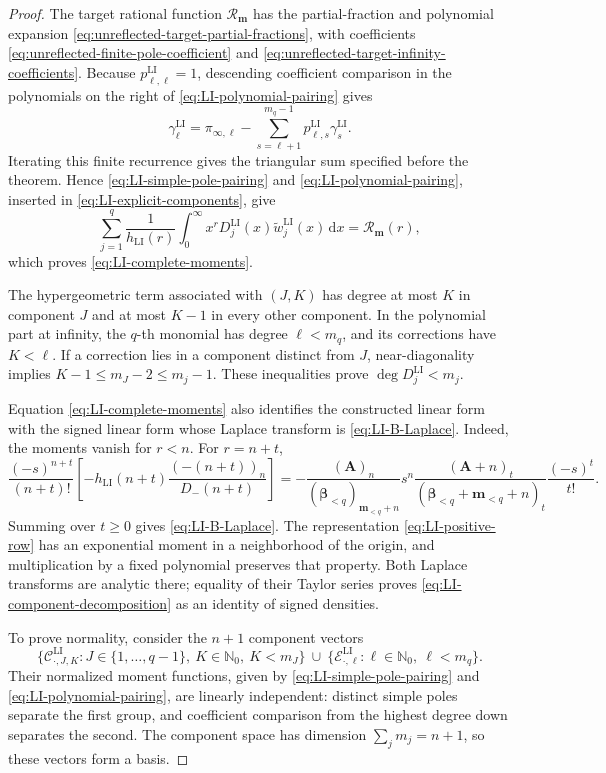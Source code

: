 \documentclass[10pt]{amsart}
\newcommand{\Nzero}{\mathbb N_0}
\newcommand{\dd}{\,\mathrm d}
\newcommand{\A}{\boldsymbol A}
\newcommand{\bbeta}{\boldsymbol\beta}
\newcommand{\mm}{\boldsymbol m}
\theoremstyle{plain}
\theoremstyle{definition}
\theoremstyle{remark}
\begin{document}
\begin{proof}
The target rational function \(\mathcal R_{\mm}\) has the partial-fraction and
polynomial expansion \eqref{eq:unreflected-target-partial-fractions},
with coefficients \eqref{eq:unreflected-finite-pole-coefficient} and
\eqref{eq:unreflected-target-infinity-coefficients}.  Because
\(p_{\ell,\ell}^{\mathrm{LI}}=1\), descending coefficient comparison in
the polynomials on the right of \eqref{eq:LI-polynomial-pairing} gives
\[
 \gamma_\ell^{\mathrm{LI}}
 =\pi_{\infty,\ell}
 -\sum_{s=\ell+1}^{m_q-1}
  p_{\ell,s}^{\mathrm{LI}}\gamma_s^{\mathrm{LI}}.
\]
Iterating this finite recurrence gives the triangular sum specified before
the theorem. Hence \eqref{eq:LI-simple-pole-pairing} and
\eqref{eq:LI-polynomial-pairing}, inserted in
\eqref{eq:LI-explicit-components}, give
\[
 \sum_{j=1}^q\frac1{h_{\mathrm{LI}}(r)}
 \int_0^\infty x^rD_j^{\mathrm{LI}}(x)
 \widetilde w_j^{\mathrm{LI}}(x)\dd x
 =\mathcal R_{\mm}(r),
\]
which proves \eqref{eq:LI-complete-moments}.

The hypergeometric term associated with \((J,K)\) has degree at most \(K\)
in component \(J\) and at most \(K-1\) in every other component. In the
polynomial part at infinity, the \(q\)-th monomial has
degree \(\ell<m_q\), and its corrections have \(K<\ell\).  If a
correction lies in a component distinct from \(J\), near-diagonality implies
\(K-1\le m_J-2\le m_j-1\).  These inequalities prove
\(\deg D_j^{\mathrm{LI}}<m_j\).

Equation \eqref{eq:LI-complete-moments} also identifies the constructed
linear form with the signed linear form whose Laplace transform is
\eqref{eq:LI-B-Laplace}.  Indeed, the moments vanish for \(r<n\).  For
\(r=n+t\),
\[
 \frac{(-s)^{n+t}}{(n+t)!}
 \left[-h_{\mathrm{LI}}(n+t)
       \frac{(-(n+t))_n}{D_-(n+t)}\right]
 =-\frac{(\A)_n}{(\bbeta_{<q})_{\mm_{<q}+n}}
 s^n
 \frac{(\A+n)_t}{(\bbeta_{<q}+\mm_{<q}+n)_t}
 \frac{(-s)^t}{t!}.
\]
Summing over \(t\ge0\) gives \eqref{eq:LI-B-Laplace}. The representation
\eqref{eq:LI-positive-row} has an exponential moment in
a neighborhood of the origin, and multiplication by a fixed polynomial
preserves that property.  Both Laplace transforms are analytic there;
equality of their Taylor series proves
\eqref{eq:LI-component-decomposition} as an identity of signed densities.

To prove normality, consider the \(n+1\) component vectors
\[
 \{\mathcal C_{\cdot,J,K}^{\mathrm{LI}}:
 J\in\{1,\ldots,q-1\},\ K\in\Nzero,\ K<m_J\}
 \ \cup\
 \{\mathcal E_{\cdot,\ell}^{\mathrm{LI}}:
 \ell\in\Nzero,\ \ell<m_q\}.
\]
Their normalized moment functions, given by
\eqref{eq:LI-simple-pole-pairing} and
\eqref{eq:LI-polynomial-pairing}, are linearly independent: distinct
simple poles separate the first group, and coefficient comparison from
the highest degree down separates the second.  The component space has
dimension \(\sum_jm_j=n+1\), so these vectors form a basis.


\end{proof}
\end{document}
